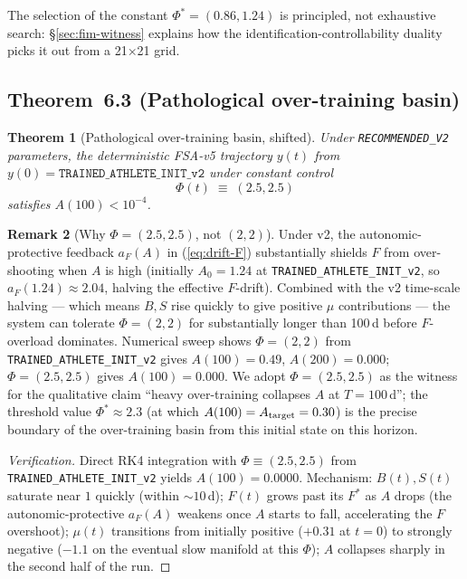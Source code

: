 \documentclass[11pt,a4paper]{article}
\newtheorem{theorem}{Theorem}
\theoremstyle{definition}
\newtheorem{remark}[theorem]{Remark}
\begin{document}
The selection of the constant $\Phi^* = (0.86, 1.24)$ is principled, not exhaustive search: §\ref{sec:fim-witness} explains how the identification-controllability duality picks it out from a 21×21 grid.

\subsection{Theorem~6.3 (Pathological over-training basin)}

\begin{theorem}[Pathological over-training basin, shifted]\label{thm:t63}
Under \texttt{RECOMMENDED\_V2} parameters, the deterministic FSA-v5 trajectory $y(t)$ from $y(0) = \texttt{TRAINED\_ATHLETE\_INIT\_v2}$ under constant control
\[
\Phi(t) \;\equiv\; (2.5, 2.5)
\]
satisfies $A(100) < 10^{-4}$.
\end{theorem}

\begin{remark}[Why $\Phi = (2.5, 2.5)$, not $(2, 2)$]
Under v2, the autonomic-protective feedback $a_F(A)$ in (\ref{eq:drift-F}) substantially shields $F$ from over-shooting when $A$ is high (initially $A_0 = 1.24$ at \texttt{TRAINED\_ATHLETE\_INIT\_v2}, so $a_F(1.24) \approx 2.04$, halving the effective $F$-drift). Combined with the v2 time-scale halving — which means $B, S$ rise quickly to give positive $\mu$ contributions — the system can tolerate $\Phi = (2, 2)$ for substantially longer than 100\,d before $F$-overload dominates. Numerical sweep shows $\Phi = (2, 2)$ from \texttt{TRAINED\_ATHLETE\_INIT\_v2} gives $A(100) = 0.49$, $A(200) = 0.000$; $\Phi = (2.5, 2.5)$ gives $A(100) = 0.000$. We adopt $\Phi = (2.5, 2.5)$ as the witness for the qualitative claim ``heavy over-training collapses $A$ at $T = 100$\,d''; the threshold value $\Phi^* \approx 2.3$ (at which $A(100) = A_{\rm target} = 0.30$) is the precise boundary of the over-training basin from this initial state on this horizon.
\end{remark}

\begin{proof}[Verification]
Direct RK4 integration with $\Phi \equiv (2.5, 2.5)$ from \texttt{TRAINED\_ATHLETE\_INIT\_v2} yields $A(100) = 0.0000$. Mechanism: $B(t), S(t)$ saturate near $1$ quickly (within $\sim 10$\,d); $F(t)$ grows past its $F^*$ as $A$ drops (the autonomic-protective $a_F(A)$ weakens once $A$ starts to fall, accelerating the $F$ overshoot); $\mu(t)$ transitions from initially positive ($+0.31$ at $t = 0$) to strongly negative ($-1.1$ on the eventual slow manifold at this $\Phi$); $A$ collapses sharply in the second half of the run.
\end{proof}
\end{document}
